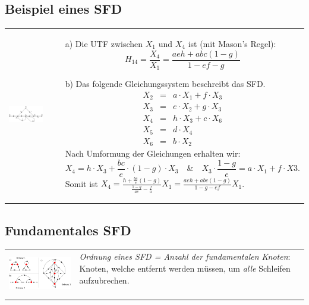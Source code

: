 \subsection{Beispiel eines SFD }
\begin{tabular}{ll}
	\parbox{7cm}{
    	\includegraphics[width=7cm]{./bilder/sfd-bsp.png}
    }
    
    & \parbox{12cm}{
    \begin{enumerate}
		\item[a)] Die UTF zwischen $X_1$ und $X_4$ ist (mit Mason's Regel):\\
		\begin{equation*}
		H_{14}=\frac{X_4}{X_1}=\frac{aeh+abc(1-g)}{1-ef-g}
		\end{equation*}
		\item[b)] Das folgende Gleichungssystem beschreibt das SFD.
		\begin{eqnarray*}
		X_2 &=&a\cdot X_1+f\cdot X_3\\
		X_3 &=&e\cdot X_2+g\cdot X_3\\
		X_4 &=&h\cdot X_3+c\cdot X_6\\
		X_5 &=&d\cdot X_4\\
		X_6 &=&b\cdot X_2
		\end{eqnarray*}
		Nach Umformung der Gleichungen erhalten wir:
		\begin{equation*}
		X_4=h\cdot X_3+\frac{bc}{e}\cdot (1-g)\cdot X_3\quad\&\quad X_3\cdot
		\frac{1-g}{e}=a\cdot X_1+f\cdot X3.
		\end{equation*}
		Somit ist $X_4=\frac{h+\frac{bc}{e}(1-g)}{\frac{1-g}{ae}-\frac{f}{a}}X_1=\frac{aeh+abc(1-g)}{1-g-ef}X_1$.
	\end{enumerate}}
\end{tabular}

\subsection{Fundamentales SFD }
\begin{tabular}{ll}
	\parbox{7cm}{
    	\includegraphics[width=7cm]{./bilder/sfd-ordnung.png}
    }
    
    & \parbox{12cm}{
		\textit{Ordnung eines SFD = Anzahl der fundamentalen Knoten}: Knoten, welche
		entfernt werden müssen, um \textit{alle} Schleifen aufzubrechen. \\ \\
	}
\end{tabular}
